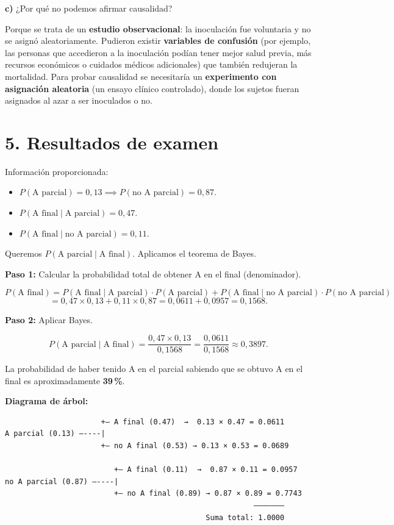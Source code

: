 \documentclass[11pt,letterpaper]{article}
\begin{document}
\textbf{c)} ¿Por qué no podemos afirmar causalidad?

Porque se trata de un \textbf{estudio observacional}: la inoculación fue voluntaria y no se asignó aleatoriamente. Pudieron existir \textbf{variables de confusión} (por ejemplo, las personas que accedieron a la inoculación podían tener mejor salud previa, más recursos económicos o cuidados médicos adicionales) que también redujeran la mortalidad. Para probar causalidad se necesitaría un \textbf{experimento con asignación aleatoria} (un ensayo clínico controlado), donde los sujetos fueran asignados al azar a ser inoculados o no.

\section*{5. Resultados de examen}

Información proporcionada:
\begin{itemize}
    \item $P(\text{A parcial}) = 0{,}13 \implies P(\text{no A parcial}) = 0{,}87$.
    \item $P(\text{A final} \mid \text{A parcial}) = 0{,}47$.
    \item $P(\text{A final} \mid \text{no A parcial}) = 0{,}11$.
\end{itemize}

Queremos $P(\text{A parcial} \mid \text{A final})$. Aplicamos el teorema de Bayes.

\textbf{Paso 1:} Calcular la probabilidad total de obtener A en el final (denominador).

\[
P(\text{A final}) = P(\text{A final} \mid \text{A parcial}) \cdot P(\text{A parcial}) + P(\text{A final} \mid \text{no A parcial}) \cdot P(\text{no A parcial})
\]
\[
= 0{,}47 \times 0{,}13 + 0{,}11 \times 0{,}87 = 0{,}0611 + 0{,}0957 = 0{,}1568.
\]

\textbf{Paso 2:} Aplicar Bayes.

\[
P(\text{A parcial} \mid \text{A final}) = \frac{0{,}47 \times 0{,}13}{0{,}1568} = \frac{0{,}0611}{0{,}1568} \approx 0{,}3897.
\]

La probabilidad de haber tenido A en el parcial sabiendo que se obtuvo A en el final es aproximadamente \textbf{39\,\%}.

\textbf{Diagrama de árbol:}

\begin{verbatim}
                      +— A final (0.47)  →  0.13 × 0.47 = 0.0611
A parcial (0.13) —----|
                      +— no A final (0.53) → 0.13 × 0.53 = 0.0689

                         +— A final (0.11)  →  0.87 × 0.11 = 0.0957
no A parcial (0.87) —----|
                         +— no A final (0.89) → 0.87 × 0.89 = 0.7743
                                                         ———————
                                              Suma total: 1.0000
\end{verbatim}
\end{document}
